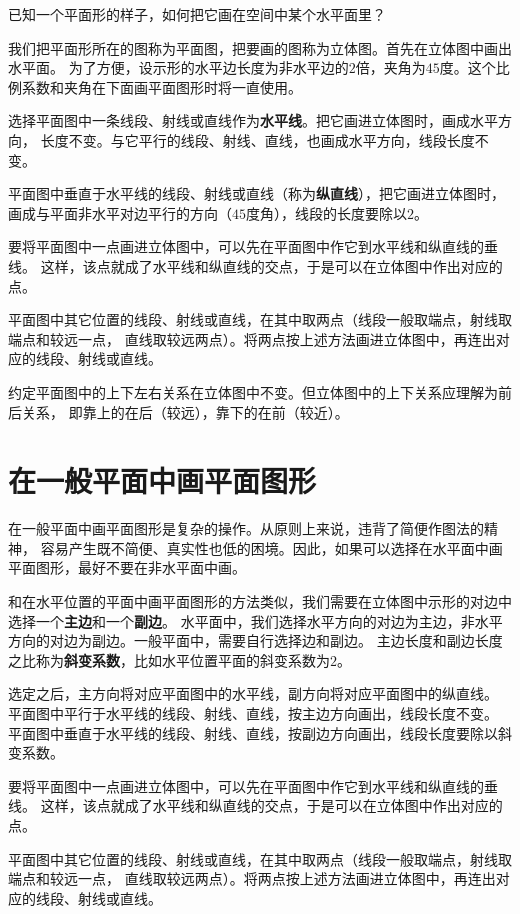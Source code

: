 \documentclass[12pt,UTF8,fontset=none]{ctexbook}
\begin{document}
\begin{appendix}
已知一个平面形的样子，如何把它画在空间中某个水平面里？

我们把平面形所在的图称为平面图，把要画的图称为立体图。首先在立体图中画出水平面。
为了方便，设示形的水平边长度为非水平边的$2$倍，夹角为$45$度。这个比例系数和夹角在下面画平面图形时将一直使用。

选择平面图中一条线段、射线或直线作为\textbf{水平线}。把它画进立体图时，画成水平方向，
长度不变。与它平行的线段、射线、直线，也画成水平方向，线段长度不变。

平面图中垂直于水平线的线段、射线或直线（称为\textbf{纵直线}），把它画进立体图时，
画成与平面非水平对边平行的方向（$45$度角），线段的长度要除以$2$。

要将平面图中一点画进立体图中，可以先在平面图中作它到水平线和纵直线的垂线。
这样，该点就成了水平线和纵直线的交点，于是可以在立体图中作出对应的点。

平面图中其它位置的线段、射线或直线，在其中取两点（线段一般取端点，射线取端点和较远一点，
直线取较远两点）。将两点按上述方法画进立体图中，再连出对应的线段、射线或直线。

约定平面图中的上下左右关系在立体图中不变。但立体图中的上下关系应理解为前后关系，
即靠上的在后（较远），靠下的在前（较近）。

\section{在一般平面中画平面图形}

在一般平面中画平面图形是复杂的操作。从原则上来说，违背了简便作图法的精神，
容易产生既不简便、真实性也低的困境。因此，如果可以选择在水平面中画平面图形，最好不要在非水平面中画。

和在水平位置的平面中画平面图形的方法类似，我们需要在立体图中示形的对边中选择一个\textbf{主边}和一个\textbf{副边}。
水平面中，我们选择水平方向的对边为主边，非水平方向的对边为副边。一般平面中，需要自行选择边和副边。
主边长度和副边长度之比称为\textbf{斜变系数}，比如水平位置平面的斜变系数为$2$。

选定之后，主方向将对应平面图中的水平线，副方向将对应平面图中的纵直线。
平面图中平行于水平线的线段、射线、直线，按主边方向画出，线段长度不变。
平面图中垂直于水平线的线段、射线、直线，按副边方向画出，线段长度要除以斜变系数。

要将平面图中一点画进立体图中，可以先在平面图中作它到水平线和纵直线的垂线。
这样，该点就成了水平线和纵直线的交点，于是可以在立体图中作出对应的点。

平面图中其它位置的线段、射线或直线，在其中取两点（线段一般取端点，射线取端点和较远一点，
直线取较远两点）。将两点按上述方法画进立体图中，再连出对应的线段、射线或直线。


\end{appendix}
\end{document}
